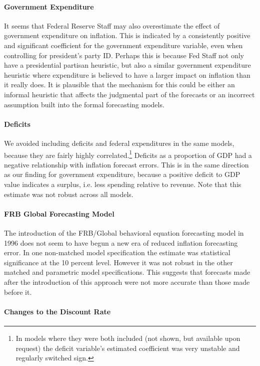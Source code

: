\documentclass[a4paper]{article}\usepackage{graphicx, color}
\begin{document}
\paragraph{Government Expenditure}

It seems that Federal Reserve Staff may also overestimate the effect of government expenditure on inflation. This is indicated by a consistently positive and significant coefficient for the government expenditure variable, even when controlling for president's party ID. Perhaps this is because Fed Staff not only have a presidential partisan heuristic, but also a similar government expenditure heuristic where expenditure is believed to have a larger impact on inflation than it really does. It is plausible that the mechanism for this could be either an informal heuristic that affects the judgmental part of the forecasts or an incorrect assumption built into the formal forecasting models.

\paragraph{Deficits} We avoided including deficits and federal expenditures in the same models, because they are fairly highly correlated.\footnote{In models where they were both included (not shown, but available upon request) the deficit variable's estimated coefficient was very unstable and regularly switched sign.} Deficits as a proportion of GDP had a negative relationship with inflation forecast errors. This is in the same direction as our finding for government expenditure, because a positive deficit to GDP value indicates a surplus, i.e. less spending relative to revenue. Note that this estimate was not robust across all models.

\paragraph{FRB Global Forecasting Model}

The introduction of the FRB/Global behavioral equation forecasting model in 1996 does not seem to have begun a new era of reduced inflation forecasting error. In one non-matched model specification the estimate was statistical significance at the 10 percent level. However it was not robust in the other matched and parametric model specifications. This suggests that forecasts made after the introduction of this approach were not more accurate than those made before it. 

\paragraph{Changes to the Discount Rate}
\end{document}
